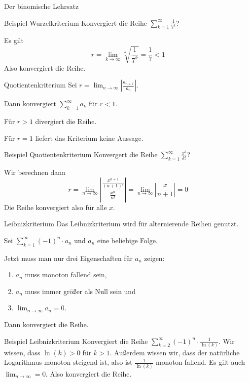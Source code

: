 \documentclass[german]{spicker}
\begin{document}
\begin{defi}{Der binomische Lehrsatz}
\begin{bonus}{Beispiel Wurzelkriterium}
    Konvergiert die Reihe $\sum_{k=1}^{\infty} \frac{1}{7^k}$?

    Es gilt
    \[
        r = \lim_{k\to\infty} \sqrt[k]{\frac{1}{7^k}} = \frac{1}{7} < 1
    \]
    Also konvergiert die Reihe.
\end{bonus}

\begin{algo}{Quotientenkriterium}
    Sei $r = \lim_{n\to\infty} \left| \frac{a_{n+1}}{a_n} \right|$.

    Dann konvergiert $\sum_{k=1}^{\infty} a_k$ für $r<1$.

    Für $r>1$ divergiert die Reihe.

    Für $r=1$ liefert das Kriterium keine Aussage.
\end{algo}

\begin{bonus}{Beispiel Quotientenkriterium}
    Konvergert die Reihe $\sum_{k=1}^{\infty} \frac{x^k}{k!}$?

    Wir berechnen dann
    \[
        r = \lim_{n\to\infty} \left| \frac{\frac{x^{n+1}}{(n+1)!}}{\frac{x^n}{n!}} \right|
        = \lim_{n\to\infty} \left| \frac{x}{n+1} \right| = 0
    \]
    Die Reihe konvergiert also für alle $x$.
\end{bonus}

\begin{algo}{Leibnizkriterium}
    Das Leibnizkriterium wird für alternierende Reihen genutzt.

    Sei $\sum_{k=1}^{\infty} (-1)^n \cdot a_n$ und $a_n$ eine beliebige Folge.

    Jetzt muss man nur drei Eigenschaften für $a_n$ zeigen:
    \begin{enumerate}
        \item $a_n$ muss monoton fallend sein,
        \item $a_n$ muss immer größer als Null sein und
        \item $\lim_{n\to\infty} a_n =0$.
    \end{enumerate}

    Dann konvergiert die Reihe.
\end{algo}

\begin{bonus}{Beispiel Leibnizkriterium}
    Konvergiert die Reihe $\sum_{k=2}^{\infty} (-1)^n \cdot \frac{1}{\ln(k)}$.
    Wir wissen, dass $\ln(k) > 0$ für $k>1$.
    Außerdem wissen wir, dass der natürliche Logarithmus monoton steigend ist, also ist $\frac{1}{\ln(k)}$ monoton fallend.
    Es gilt auch $\lim_{n\to\infty} = 0$. Also konvergiert die Reihe.
\end{bonus}



\end{defi}
\end{document}
